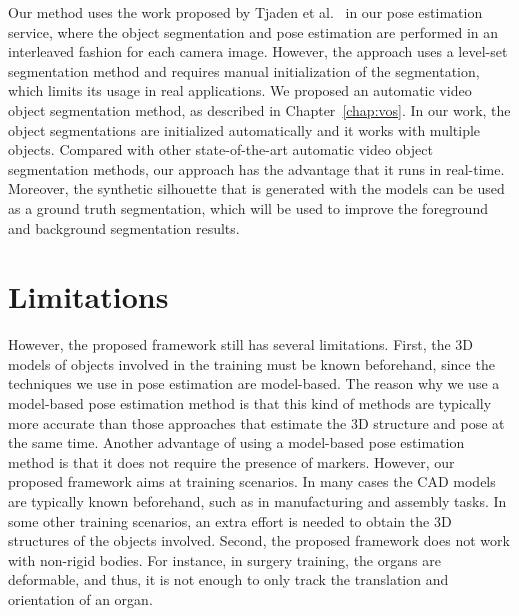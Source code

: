 Our method uses the work proposed by Tjaden et al.~\cite{tjaden2016} in our pose estimation service, where the object segmentation and pose estimation are performed in an interleaved fashion for each camera image.
However, the approach uses a level-set segmentation method and requires manual initialization of the segmentation, which limits its usage in real applications.
We proposed an automatic video object segmentation method, as described in Chapter~\ref{chap:vos}. In our work, the object segmentations are initialized automatically and it works with multiple objects.
Compared with other state-of-the-art automatic video object segmentation methods, our approach has the advantage that it runs in real-time.
Moreover, the synthetic silhouette that is generated with the models can be used as a ground truth segmentation, which will be used to improve the foreground and background segmentation results.

\section{Limitations}
\label{sec:dm:l}

However, the proposed framework still has several limitations.
First, the 3D models of objects involved in the training must be known beforehand, since the techniques we use in pose estimation are model-based.
The reason why we use a model-based pose estimation method is that this kind of methods are typically more accurate than those approaches that estimate the 3D structure and pose at the same time. Another advantage of using a model-based pose estimation method is that it does not require the presence of markers.
However, our proposed framework aims at training scenarios. In many cases the CAD models are typically known beforehand, such as in manufacturing and assembly tasks.
In some other training scenarios, an extra effort is needed to obtain the 3D structures of the objects involved.
Second, the proposed framework does not work with non-rigid bodies.
For instance, in surgery training, the organs are deformable, and thus, it is not enough to only track the translation and orientation of an organ.
